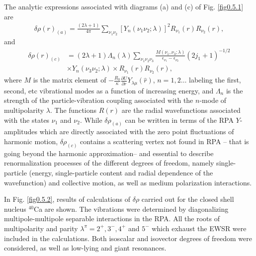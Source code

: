 The analytic expressions associated with diagrams (a) and (c) of Fig. \ref{fig0.5.1} are 
\begin{align}\label{eq0.1.127}
\delta\rho(r)_{(a)}=\frac{(2\lambda+1)}{4\pi}\sum_{\nu_1\nu_2}\left[Y_n(\nu_1\nu_2;\lambda)\right]^2 R_{\nu_1}(r)R_{\nu_2}(r),
\end{align}
and
\begin{align}\label{eq0.1.128}
\nonumber \delta\rho(r)_{(c)}&=(2\lambda+1)\Lambda_n(\lambda)\sum_{\nu_1\nu_2\nu_3}\frac{M(\nu_1,\nu_3;\lambda)}{\epsilon_{\nu_1}-\epsilon_{\nu_2}}(2j_1+1)^{-1/2}\\&\times Y_n(\nu_3\nu_2;\lambda)\times R_{\nu_1}(r)R_{\nu_2}(r),
\end{align}
where $M$ is the matrix element of $-\frac{R_0}{\kappa}\frac{\partial U}{\partial r}Y_{\lambda\mu}(\hat r)$,  $n=1,2\dots$ labeling the first, second, etc vibrational modes as a function of increasing energy, and $\Lambda_n$ is the strength of the particle-vibration coupling associated with the $n$-mode of multipolarity $\lambda$. The functions $R(r)$ are the radial wavefunctions associated with the states $\nu_1$ and $\nu_2$. While $\delta\rho_{(a)}$ can be written in terms of the RPA $Y$-amplitudes which are directly associated with the zero point fluctuations of harmonic motion, $\delta\rho_{(c)}$ contains a scattering vertex not found in RPA -- that is going beyond the harmonic approximation-- and essential to describe renormalization processes of the different degrees of freedom, namely single-particle (energy, single-particle content and radial dependence of the wavefunction) and collective motion, as well as medium polarization interactions. 

In Fig. \ref{fig0.5.2},  results of calculations of $\delta\rho$ carried out for the closed shell nucleus $^{40}$Ca are shown. The vibrations were determined by diagonalizing multipole-multipole separable interactions  in the RPA. All the roots of multipolarity and parity $\lambda^\pi=2^+,3^-,4^+$ and $5^-$ which exhaust the EWSR were included in the calculations. Both isoscalar and isovector degrees of freedom were considered, as well as  low-lying and giant resonances.

